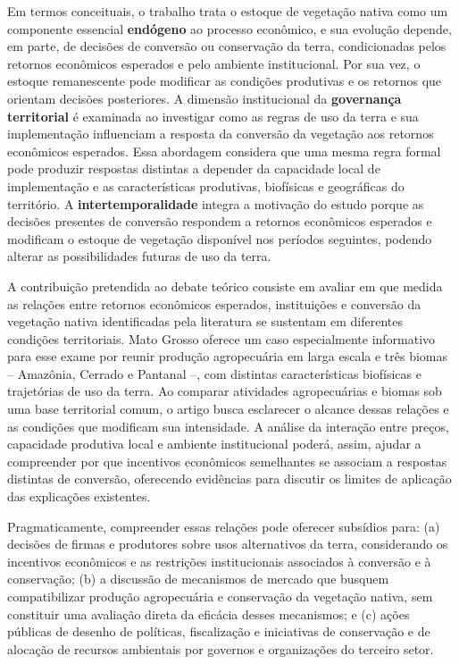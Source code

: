 Em termos conceituais, o trabalho trata o estoque de vegetação nativa como um componente essencial \textbf{endógeno} ao processo econômico, e sua evolução depende, em parte, de decisões de conversão ou conservação da terra, condicionadas pelos retornos econômicos esperados e pelo ambiente institucional. Por sua vez, o estoque remanescente pode modificar as condições produtivas e os retornos que orientam decisões posteriores. A dimensão institucional da \textbf{governança territorial} é examinada ao investigar como as regras de uso da terra e sua implementação influenciam a resposta da conversão da vegetação aos retornos econômicos esperados. Essa abordagem considera que uma mesma regra formal pode produzir respostas distintas a depender da capacidade local de implementação e as características produtivas, biofísicas e geográficas do território. A \textbf{intertemporalidade} integra a motivação do estudo porque as decisões presentes de conversão respondem a retornos econômicos esperados e modificam o estoque de vegetação disponível nos períodos seguintes, podendo alterar as possibilidades futuras de uso da terra. 

A contribuição pretendida ao debate teórico consiste em avaliar em que medida as relações entre retornos econômicos esperados, instituições e conversão da vegetação nativa identificadas pela literatura se sustentam em diferentes condições territoriais. Mato Grosso oferece um caso especialmente informativo para esse exame por reunir produção agropecuária em larga escala e três biomas -- Amazônia, Cerrado e Pantanal --, com distintas características biofísicas e trajetórias de uso da terra. Ao comparar atividades agropecuárias e biomas sob uma base territorial comum, o artigo busca esclarecer o alcance dessas relações e as condições que modificam sua intensidade. A análise da interação entre preços, capacidade produtiva local e ambiente institucional poderá, assim, ajudar a compreender por que incentivos econômicos semelhantes se associam a respostas distintas de conversão, oferecendo evidências para discutir os limites de aplicação das explicações existentes.

Pragmaticamente, compreender essas relações pode oferecer subsídios para: (a) decisões de firmas e produtores sobre usos alternativos da terra, considerando os incentivos econômicos e as restrições institucionais associados à conversão e à conservação; (b) a discussão de mecanismos de mercado que busquem compatibilizar produção agropecuária e conservação da vegetação nativa, sem constituir uma avaliação direta da eficácia desses mecanismos; e (c) ações públicas de desenho de políticas, fiscalização e iniciativas de conservação e de alocação de recursos ambientais por governos e organizações do terceiro setor.

